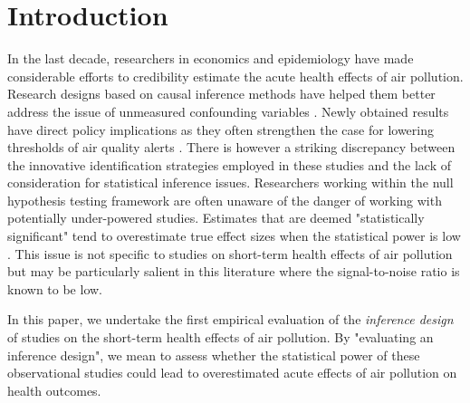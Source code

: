 \documentclass[12pt]{article}
\begin{document}
\doublespacing
\linenumbers





\section{Introduction}

    In the last decade, researchers in economics and epidemiology have made considerable efforts to credibility estimate the acute health effects of air pollution. Research designs based on causal inference methods have helped them better address the issue of unmeasured confounding variables \citep{dominici_best_2017, bind_causal_2019}. Newly obtained results have direct policy implications as they often strengthen the case for lowering thresholds of air quality alerts \citep{schwartz_estimating_2015, schwartz_national_2018, deryugina_mortality_2019}. There is however a striking discrepancy between the innovative identification strategies employed in these studies and the lack of consideration for statistical inference issues. Researchers working within the null hypothesis testing framework are often unaware of the danger of working with potentially under-powered studies. Estimates that are deemed "statistically significant" tend to overestimate true effect sizes when the statistical power is low \citep{ioannidis_why_2005, gelman_beyond_2014, ioannidis_power_2017, altoe_enhancing_2020, van_buuren_flexible_nodate}. This issue is not specific to studies on short-term health effects of air pollution but may be particularly salient in this literature where the signal-to-noise ratio is known to be low.
    
    In this paper, we undertake the first empirical evaluation of the \textit{inference design} of studies on the short-term health effects of air pollution. By "evaluating an inference design", we mean to assess whether the statistical power of these observational studies could lead to overestimated acute effects of air pollution on health outcomes.
    
\end{document}
